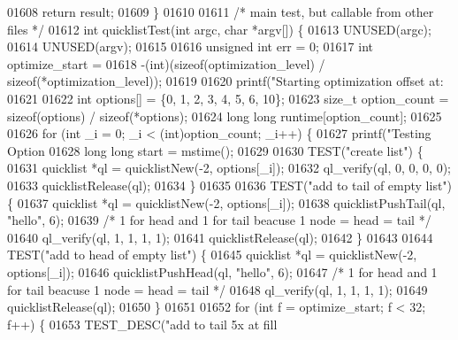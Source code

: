 \begin{DoxyCode}
{{{{{{{{{{{{{{{{{{{{{{{{{{{{{{{{{{01608     \textcolor{keywordflow}{return} result;
01609 \}
01610 
01611 \textcolor{comment}{/* main test, but callable from other files */}
01612 \textcolor{keywordtype}{int} quicklistTest(\textcolor{keywordtype}{int} argc, \textcolor{keywordtype}{char} *argv[]) \{
01613     UNUSED(argc);
01614     UNUSED(argv);
01615 
01616     \textcolor{keywordtype}{unsigned} \textcolor{keywordtype}{int} err = 0;
01617     \textcolor{keywordtype}{int} optimize\_start =
01618         -(\textcolor{keywordtype}{int})(\textcolor{keyword}{sizeof}(optimization\_level) / \textcolor{keyword}{sizeof}(*optimization\_level));
01619 
01620     printf(\textcolor{stringliteral}{"Starting optimization offset at: %
01621 
01622     \textcolor{keywordtype}{int} options[] = \{0, 1, 2, 3, 4, 5, 6, 10\};
01623     size\_t option\_count = \textcolor{keyword}{sizeof}(options) / \textcolor{keyword}{sizeof}(*options);
01624     \textcolor{keywordtype}{long} \textcolor{keywordtype}{long} runtime[option\_count];
01625 
01626     \textcolor{keywordflow}{for} (\textcolor{keywordtype}{int} \_i = 0; \_i < (\textcolor{keywordtype}{int})option\_count; \_i++) \{
01627         printf(\textcolor{stringliteral}{"Testing Option %
01628         \textcolor{keywordtype}{long} \textcolor{keywordtype}{long} start = mstime();
01629 
01630         TEST(\textcolor{stringliteral}{"create list"}) \{
01631             quicklist *ql = quicklistNew(-2, options[\_i]);
01632             ql\_verify(ql, 0, 0, 0, 0);
01633             quicklistRelease(ql);
01634         \}
01635 
01636         TEST(\textcolor{stringliteral}{"add to tail of empty list"}) \{
01637             quicklist *ql = quicklistNew(-2, options[\_i]);
01638             quicklistPushTail(ql, \textcolor{stringliteral}{"hello"}, 6);
01639             \textcolor{comment}{/* 1 for head and 1 for tail beacuse 1 node = head = tail */}
01640             ql\_verify(ql, 1, 1, 1, 1);
01641             quicklistRelease(ql);
01642         \}
01643 
01644         TEST(\textcolor{stringliteral}{"add to head of empty list"}) \{
01645             quicklist *ql = quicklistNew(-2, options[\_i]);
01646             quicklistPushHead(ql, \textcolor{stringliteral}{"hello"}, 6);
01647             \textcolor{comment}{/* 1 for head and 1 for tail beacuse 1 node = head = tail */}
01648             ql\_verify(ql, 1, 1, 1, 1);
01649             quicklistRelease(ql);
01650         \}
01651 
01652         \textcolor{keywordflow}{for} (\textcolor{keywordtype}{int} f = optimize\_start; f < 32; f++) \{
01653             TEST\_DESC(\textcolor{stringliteral}{"add to tail 5x at fill %
}}}}}}}}}}}}}}}}}}}}}}}}}}}}}}}}}}}}}
\end{DoxyCode}
